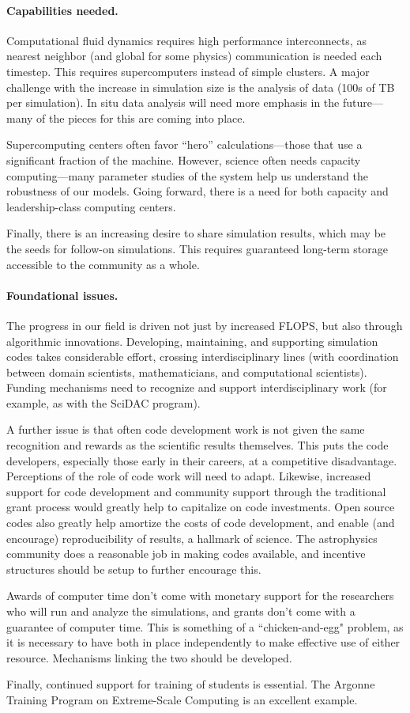 \documentclass[11pt,twocolumn]{article}
\begin{document}
\paragraph*{Capabilities needed.}  Computational fluid dynamics requires
high performance interconnects, as nearest neighbor (and global for
some physics) communication is needed each timestep.  This requires
supercomputers instead of simple clusters.  A major challenge with the
increase in simulation size is the analysis of data (100s of TB
per simulation).  In situ data analysis will need more emphasis in the
future---many of the pieces for this are coming into place.

Supercomputing centers often favor ``hero'' calculations---those that
use a significant fraction of the machine.
However, science often needs capacity computing---many parameter
studies of the system help us understand the robustness of our models.
Going forward, there is a need for both capacity and leadership-class
computing centers.

Finally, there is an increasing desire to share simulation results,
which may be the seeds for follow-on simulations.  This
requires guaranteed long-term storage accessible to the community as a
whole.

\paragraph*{Foundational issues.}

The progress in our field is driven not just by increased FLOPS, but
also through algorithmic innovations.  Developing, maintaining, and
supporting simulation codes takes considerable effort, crossing
interdisciplinary lines (with coordination between domain scientists,
mathematicians, and computational scientists).  Funding mechanisms
need to recognize and support interdisciplinary work (for
example, as with the SciDAC program).

A further issue is that
often code development work is not given the same recognition and
rewards as the scientific results themselves.  This puts the code
developers, especially those early in their careers, at a competitive
disadvantage.  Perceptions of the role of code work will need to
adapt.  Likewise, increased support for code development and community
support through the traditional grant process would greatly help to
capitalize on code investments.  Open source codes also greatly help
amortize the costs of code development, and enable (and encourage)
reproducibility of results, a hallmark of science.  The astrophysics
community does a reasonable job in making codes available, and
incentive structures should be setup to further encourage this.

Awards of computer time don't come with monetary support for the
researchers who will run and analyze the simulations, and grants don't
come with a guarantee of computer time.  This is something of a
``chicken-and-egg" problem, as it is necessary to have both in place
independently to make effective use of either resource.  Mechanisms
linking the two should be developed.

Finally, continued support for training of students is essential. The
Argonne Training Program on Extreme-Scale Computing is an excellent
example.
\end{document}
